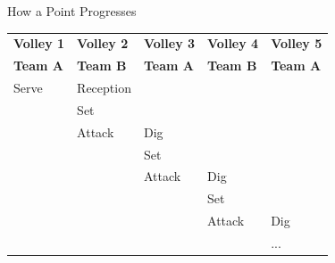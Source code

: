 \documentclass[handout]{beamer}
\begin{document}
\begin{frame}{How a Point Progresses}
  \centering
  \begin{tabular}{lllll}
    \bf Volley 1  & \bf Volley 2  & \bf Volley 3  & \bf Volley 4  & \bf Volley 5\\
    \bf Team A    & \bf Team B    & \bf Team A    & \bf Team B    & \bf Team A\\
    \hline
    \cline{1-2}
    \multicolumn{1}{|l}{Serve}  & \multicolumn{1}{l|}{Reception}\\
    \cline{1-2}
                                & Set\\
    \cline{2-3}
                                & \multicolumn{1}{|l}{Attack} & \multicolumn{1}{l|}{Dig}\\
    \cline{2-3}
                                &                             & Set\\
    \cline{3-4}
                                &                             & \multicolumn{1}{|l}{Attack} & \multicolumn{1}{l|}{Dig}\\
    \cline{3-4}
                                &                             &                             & Set\\
    \cline{4-5}
                                &                             &                             & \multicolumn{1}{|l}{Attack} & \multicolumn{1}{l|}{Dig}\\
    \cline{4-5}
                                &                             &                             &                             & ...
  \end{tabular}
\end{frame}
\end{document}
